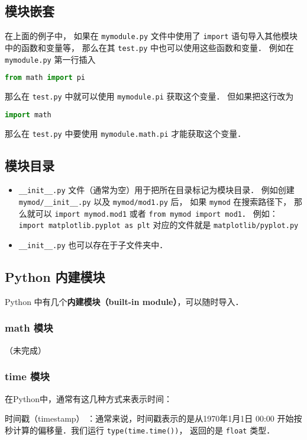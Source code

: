 \subsection{模块嵌套}
在上面的例子中， 如果在 \verb|mymodule.py| 文件中使用了 \verb|import| 语句导入其他模块中的函数和变量等， 那么在其 \verb|test.py| 中也可以使用这些函数和变量． 例如在 \verb|mymodule.py| 第一行插入
\begin{lstlisting}[language=python]
from math import pi
\end{lstlisting}
那么在 \verb|test.py| 中就可以使用 \verb|mymodule.pi| 获取这个变量． 但如果把这行改为
\begin{lstlisting}[language=python]
import math
\end{lstlisting}
那么在 \verb|test.py| 中要使用 \verb|mymodule.math.pi| 才能获取这个变量．

\subsection{模块目录}
\begin{itemize}
\item \verb|__init__.py| 文件（通常为空）用于把所在目录标记为模块目录． 例如创建 \verb|mymod/__init__.py| 以及 \verb|mymod/mod1.py| 后， 如果 \verb|mymod| 在搜索路径下， 那么就可以 \verb|import mymod.mod1| 或者 \verb|from mymod import mod1|． 例如： \verb|import matplotlib.pyplot as plt| 对应的文件就是 \verb|matplotlib/pyplot.py|
\item \verb|__init__.py| 也可以存在于子文件夹中．
\end{itemize}


\subsection{Python 内建模块}
Python 中有几个\textbf{内建模块（built-in module）}，可以随时导入．

\subsubsection{math 模块}
（未完成）

\subsubsection{time 模块}
在Python中，通常有这几种方式来表示时间：

时间戳（timestamp） ：通常来说，时间戳表示的是从1970年1月1日 00:00 开始按秒计算的偏移量．我们运行 \verb|type(time.time())|， 返回的是 \verb|float| 类型．

